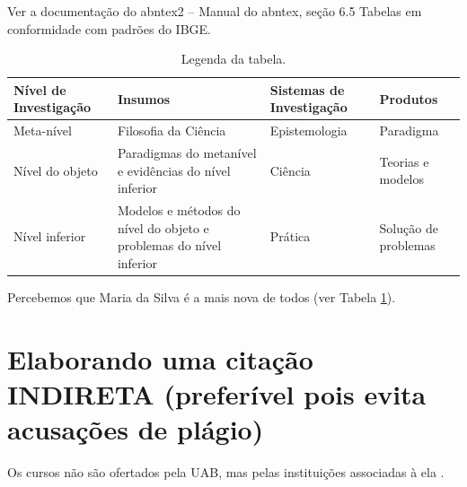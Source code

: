 \documentclass[
	12pt,				%
  openright,			%
	twoside,			%
	a4paper,			%
	english,			%
	french,				%
	spanish,			%
	brazil				%
	]{abntex2}
\begin{document}
Ver a documentação do abntex2 -- Manual do abntex, seção 6.5 Tabelas em
conformidade com padrões do IBGE.

\begin{table}[htb]
\ABNTEXfontereduzida
\caption[Legenda da tabela.]{Legenda da tabela.}
\label{tab:15560}
\begin{tabular}{p{2.6cm}|p{6.0cm}|p{2.25cm}|p{3.40cm}}
   \textbf{Nível de Investigação} & \textbf{Insumos}  & \textbf{Sistemas de Investigação}  & \textbf{Produtos}  \\
    \hline
    Meta-nível & Filosofia\index{filosofia} da Ciência  & Epistemologia &
    Paradigma  \\
    \hline
    Nível do objeto & Paradigmas do metanível e evidências do nível inferior &
    Ciência  & Teorias e modelos \\
    \hline
    Nível inferior & Modelos e métodos do nível do objeto e problemas do nível inferior & Prática & Solução de problemas  \\
\end{tabular}
\end{table}
\begin{table}[htb]
\end{table}

Percebemos que Maria da Silva é a mais nova de todos (ver Tabela
\ref{tab:15560}).

\chapter{Elaborando uma citação INDIRETA (preferível pois evita
acusações de
plágio)}\label{elaborando-uma-citauxe7uxe3o-indireta-preferuxedvel-pois-evita-acusauxe7uxf5es-de-pluxe1gio}

Os cursos não são ofertados pela UAB, mas pelas instituições associadas
à ela \cite{preti2005educaccao}.
\end{document}
